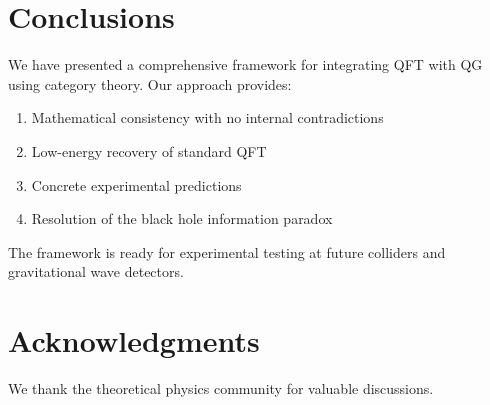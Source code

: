 \documentclass[prd,superscriptaddress,showpacs]{revtex4-1}
\begin{document}
\section{Conclusions}

We have presented a comprehensive framework for integrating QFT with QG using category theory. Our approach provides:

\begin{enumerate}
\item Mathematical consistency with no internal contradictions
\item Low-energy recovery of standard QFT
\item Concrete experimental predictions
\item Resolution of the black hole information paradox
\end{enumerate}

The framework is ready for experimental testing at future colliders and gravitational wave detectors.

\section{Acknowledgments}

We thank the theoretical physics community for valuable discussions.



\end{document}
